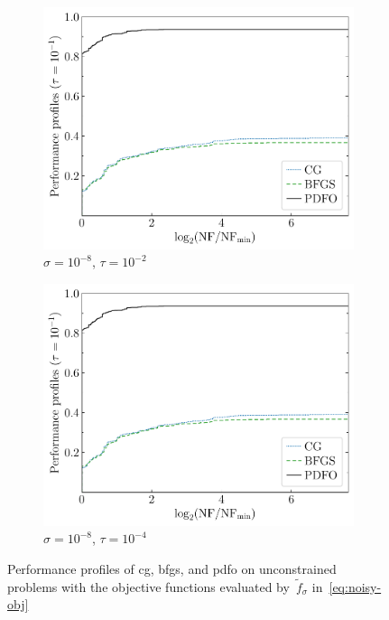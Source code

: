 \documentclass[manuscript,screen,review]{acmart}
\numberwithin{equation}{section}
\newcommand*{\obj}{f}
\begin{document}
\begin{figure}[htbp]
\begin{subfigure}{.48\textwidth}
        \includegraphics[width=\textwidth,page=2]{perf-noisy-bfgs_cg_pdfo-50-8.pdf}
        \caption{$\sigma = 10^{-8}$, $\tau = 10^{-2}$}
    \end{subfigure}
    \hfill
    \begin{subfigure}{.48\textwidth}
        \centering
        \includegraphics[width=\textwidth,page=4]{perf-noisy-bfgs_cg_pdfo-50-8.pdf}
        \caption{$\sigma = 10^{-8}$, $\tau = 10^{-4}$}
    \end{subfigure}
    \caption{Performance profiles of \gls{cg}, \gls{bfgs}, and \gls{pdfo} on unconstrained problems with the objective functions evaluated by~$\tilde{\obj}_\sigma$ in~\eqref{eq:noisy-obj}}
    \label{fig:noise}
\end{figure}
\end{document}
